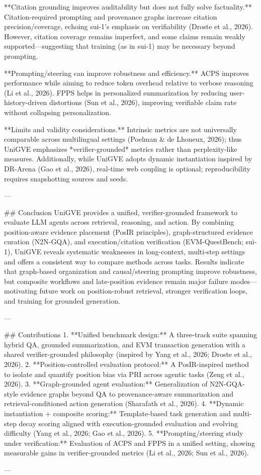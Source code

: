 **Citation grounding improves auditability but does not fully solve factuality.** Citation-required prompting and provenance graphs increase citation precision/coverage, echoing sui-1’s emphasis on verifiability (Droste et al., 2026). However, citation coverage remains imperfect, and some claims remain weakly supported—suggesting that training (as in sui-1) may be necessary beyond prompting.

**Prompting/steering can improve robustness and efficiency.** ACPS improves performance while aiming to reduce token overhead relative to verbose reasoning (Li et al., 2026). FPPS helps in personalized summarization by reducing user-history-driven distortions (Sun et al., 2026), improving verifiable claim rate without collapsing personalization.

**Limits and validity considerations.** Intrinsic metrics are not universally comparable across multilingual settings (Poelman & de Lhoneux, 2026); thus UniGVE emphasizes *verifier-grounded* metrics rather than perplexity-like measures. Additionally, while UniGVE adopts dynamic instantiation inspired by DR-Arena (Gao et al., 2026), real-time web coupling is optional; reproducibility requires snapshotting sources and seeds.

---

## Conclusion  
UniGVE provides a unified, verifier-grounded framework to evaluate LLM agents across retrieval, reasoning, and action. By combining position-aware evidence placement (PosIR principles), graph-structured evidence curation (N2N-GQA), and execution/citation verification (EVM-QuestBench; sui-1), UniGVE reveals systematic weaknesses in long-context, multi-step settings and offers a consistent way to compare methods across tasks. Results indicate that graph-based organization and causal/steering prompting improve robustness, but composite workflows and late-position evidence remain major failure modes—motivating future work on position-robust retrieval, stronger verification loops, and training for grounded generation.

---

## Contributions  
1. **Unified benchmark design:** A three-track suite spanning hybrid QA, grounded summarization, and EVM transaction generation with a shared verifier-grounded philosophy (inspired by Yang et al., 2026; Droste et al., 2026).  
2. **Position-controlled evaluation protocol:** A PosIR-inspired method to isolate and quantify position bias via PRI across agentic tasks (Zeng et al., 2026).  
3. **Graph-grounded agent evaluation:** Generalization of N2N-GQA-style evidence graphs beyond QA to provenance-aware summarization and retrieval-conditioned action generation (Sharafath et al., 2026).  
4. **Dynamic instantiation + composite scoring:** Template-based task generation and multi-step decay scoring aligned with execution-grounded evaluation and evolving difficulty (Yang et al., 2026; Gao et al., 2026).  
5. **Prompting/steering study under verification:** Evaluation of ACPS and FPPS in a unified setting, showing measurable gains in verifier-grounded metrics (Li et al., 2026; Sun et al., 2026).

---